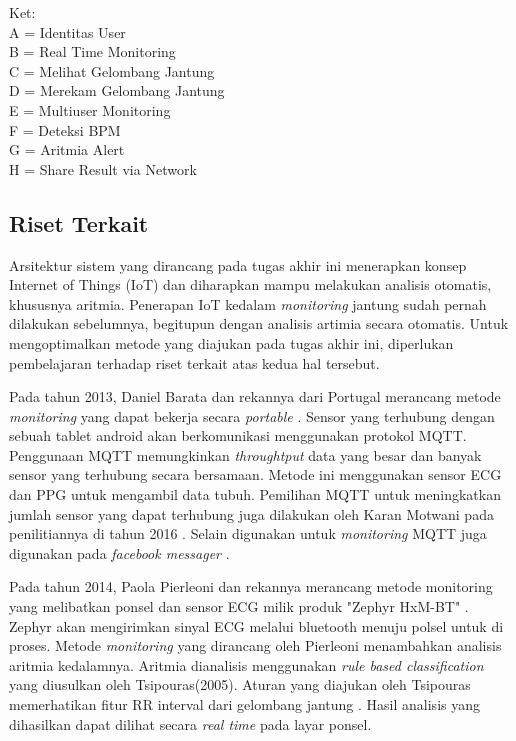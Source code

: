 Ket: \\
A = Identitas User \\
B = Real Time Monitoring \\
C = Melihat Gelombang Jantung \\
D = Merekam Gelombang Jantung \\
E = Multiuser Monitoring \\
F = Deteksi BPM \\
G = Aritmia Alert \\
H = Share Result via Network \\

\subsection{Riset Terkait}
Arsitektur sistem yang dirancang pada tugas akhir ini menerapkan konsep Internet of Things (IoT) dan diharapkan mampu melakukan analisis otomatis, khususnya aritmia. Penerapan IoT kedalam \textit{monitoring} jantung sudah pernah dilakukan sebelumnya, begitupun dengan analisis artimia secara otomatis. Untuk mengoptimalkan metode yang diajukan pada tugas akhir ini, diperlukan pembelajaran terhadap riset terkait atas kedua hal tersebut.

Pada tahun 2013, Daniel Barata dan rekannya dari Portugal merancang metode \textit{monitoring} yang dapat bekerja secara \textit{portable} \cite{daniel_barataa}. Sensor yang terhubung dengan sebuah tablet android akan berkomunikasi menggunakan protokol MQTT. Penggunaan MQTT memungkinkan \textit{throughtput} data yang besar dan banyak sensor yang terhubung secara bersamaan. Metode ini menggunakan sensor ECG dan PPG untuk mengambil data tubuh. Pemilihan MQTT untuk meningkatkan jumlah sensor yang dapat terhubung juga dilakukan oleh Karan Motwani pada penilitiannya di tahun 2016 \cite{karan_motwani}. Selain digunakan untuk \textit{monitoring} MQTT juga digunakan pada \textit{facebook messager} \cite{mqtt_use}.

Pada tahun 2014, Paola Pierleoni dan rekannya merancang metode monitoring yang melibatkan ponsel dan sensor ECG milik produk "Zephyr HxM-BT" \cite{paola_pierleoni}. Zephyr akan mengirimkan sinyal ECG melalui bluetooth menuju polsel untuk di proses. Metode \textit{monitoring} yang dirancang oleh Pierleoni menambahkan analisis aritmia kedalamnya. Aritmia dianalisis menggunakan \textit{rule based classification} yang diusulkan oleh Tsipouras(2005). Aturan yang diajukan oleh Tsipouras memerhatikan fitur RR interval dari gelombang jantung \cite{rr_classification}. Hasil analisis yang dihasilkan dapat dilihat secara \textit{real time} pada layar ponsel.

